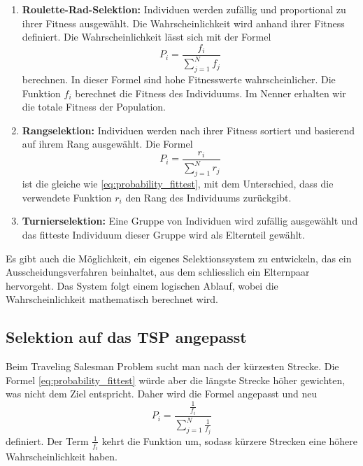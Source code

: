 \begin{enumerate}
    \item \textbf{Roulette-Rad-Selektion:} Individuen werden zufällig und
    proportional zu ihrer Fitness ausgewählt. Die Wahrscheinlichkeit wird 
    anhand ihrer Fitness definiert. Die Wahrscheinlichkeit lässt sich mit der Formel
    \begin{equation}
        P_i
        =
        \frac{f_i}{\sum_{j=1}^{N} f_j}
        \label{eq:probability_fittest}
    \end{equation}
    berechnen. In dieser Formel sind hohe Fitnesswerte wahrscheinlicher. Die Funktion \(f_i\) 
    berechnet die Fitness des Individuums. Im Nenner erhalten wir die totale Fitness der Population.
    \item \textbf{Rangselektion:} Individuen werden nach ihrer Fitness sortiert und basierend
    auf ihrem Rang ausgewählt. Die Formel 
    \begin{equation}
        P_i
        =
        \frac{r_i}{\sum_{j=1}^{N} r_j}
        \label{eq:probability_rating}
    \end{equation}
    ist die gleiche wie \eqref{eq:probability_fittest}, mit dem Unterschied, dass die verwendete Funktion 
    \(r_i\) den Rang des Individuums zurückgibt.
    \item \textbf{Turnierselektion:} Eine Gruppe von Individuen wird zufällig ausgewählt
    und das fitteste Individuum dieser Gruppe wird als Elternteil gewählt.
\end{enumerate}
Es gibt auch die Möglichkeit, ein eigenes Selektionssystem zu entwickeln, 
das ein Ausscheidungsverfahren beinhaltet, aus dem schliesslich ein 
Elternpaar hervorgeht. Das System folgt einem logischen Ablauf, wobei 
die Wahrscheinlichkeit mathematisch berechnet wird.

\subsection{Selektion auf das TSP angepasst
\label{buch:paper:varalg:subsection:selection_tsp}}
Beim Traveling Salesman Problem sucht man nach der kürzesten Strecke. Die Formel 
\eqref{eq:probability_fittest} würde aber die längste Strecke höher gewichten, was
nicht dem Ziel entspricht. Daher wird die Formel angepasst und neu 
\begin{equation}
    P_i
    =
    \frac{\frac{1}{f_i}}{\sum_{j=1}^{N} \frac{1}{f_j}}
    \label{eq:probability_fittest_tsp}
\end{equation}
definiert. Der Term \(\frac{1}{f_i}\) kehrt die Funktion um, sodass kürzere Strecken eine höhere
Wahrscheinlichkeit haben.
